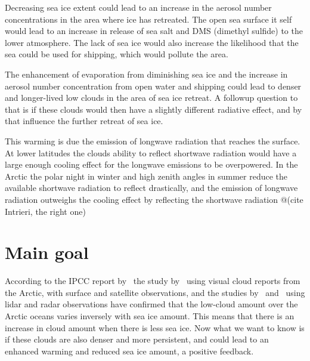 Decreasing sea ice extent could lead to an increase in the aerosol number concentrations in the area where ice has retreated. The open sea surface it self would lead to an increase in release of sea salt and DMS (dimethyl sulfide) to the lower atmosphere. The lack of sea ice would also increase the likelihood that the sea could be used for shipping, which would pollute the area.

The enhancement of evaporation from diminishing sea ice and the increase in aerosol number concentration from open water and shipping could lead to denser and longer-lived low clouds in the area of sea ice retreat. A followup question to that is if these clouds would then have a slightly different radiative effect, and by that influence the further retreat of sea ice.


This warming is due the emission of longwave radiation that reaches the surface. At lower latitudes the clouds ability to reflect shortwave radiation would have a large enough cooling effect for the longwave emissions to be overpowered. In the Arctic the polar night in winter and high zenith angles in summer reduce the available shortwave radiation to reflect drastically, and the emission of longwave radiation outweighs the cooling effect by reflecting the shortwave radiation @(cite Intrieri, the right one)
 


\section{Main goal}
According to the IPCC report by~\citet{Boucher2013} the study by~\citet{Eastman2010b} using visual cloud reports from the Arctic, with surface and satellite observations, and the studies by~\citet{Kay2009} and~\citet{Palm2010} using lidar and radar observations have confirmed that the low-cloud amount over the Arctic oceans varies inversely with sea ice amount. This means that there is an increase in cloud amount when there is less sea ice. Now what we want to know is if these clouds are also denser and more persistent, and could lead to an enhanced warming and reduced sea ice amount, a positive feedback.

